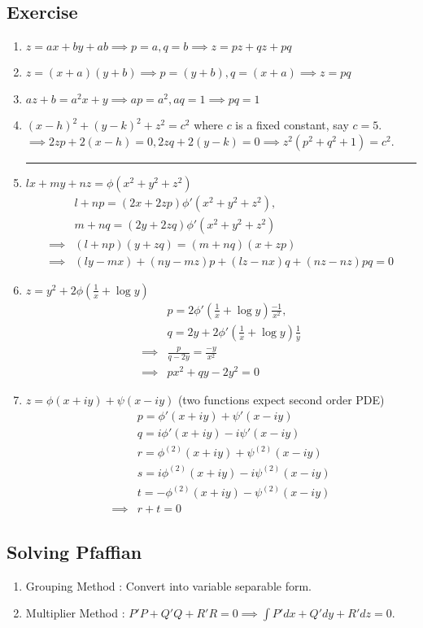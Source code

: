 \subsection{Exercise}
\begin{enumerate}
	\item $z = ax+by+ab \implies p = a, q=b \implies z = pz+qz+pq$
	\item $z = (x+a)(y+b) \implies p = (y+b),q = (x+a) \implies z = pq$
	\item $az+b = a^2x + y \implies ap = a^2,aq=1 \implies pq = 1$
	\item $(x-h)^2 + (y-k)^2 + z^2 = c^2$ where $c$ is a fixed constant, say $c = 5$.\\
		$\implies 2zp + 2(x-h) = 0, 2zq + 2(y-k) = 0 \implies z^2(p^2 + q^2 + 1) = c^2$.
	\hrule
\item $lx+my+nz = \phi(x^2+y^2+z^2)$ 
\begin{align*}
	& l+np = (2x+2zp)\phi'(x^2+y^2+z^2),\\
	& m+nq  = (2y+2zq)\phi'(x^2+y^2+z^2) \\
	\implies & (l+np)(y+zq)  = (m+nq)(x+zp) \\
	\implies & (ly-mx)+(ny-mz)p + (lz-nx)q + (nz-nz)pq = 0
\end{align*}
\item $z = y^2 + 2\phi(\frac{1}{x} + \log y)$ 
\begin{align*}
	& p = 2\phi'(\frac{1}{x}+\log y) \frac{-1}{x^2},\\
	& q = 2y + 2\phi'(\frac{1}{x} + \log y) \frac{1}{y}\\
	\implies & \frac{p}{q-2y} = \frac{-y}{x^2}\\
	\implies & px^2+qy-2y^2 = 0
\end{align*}
\item $z = \phi(x+iy)+\psi(x-iy)$ (two functions expect second order PDE)
\begin{align*}
	& p = \phi'(x+iy) + \psi'(x-iy)\\
	& q = i\phi'(x+iy) -i \psi'(x-iy)\\
	& r = \phi^{(2)}(x+iy) + \psi^{(2)}(x-iy) \\
	& s = i\phi^{(2)}(x+iy) -i \psi^{(2)}(x-iy) \\
	& t = -\phi^{(2)}(x+iy) -\psi^{(2)}(x-iy)\\
	\implies & r+t = 0
\end{align*}
\end{enumerate}

\subsection{Solving Pfaffian}
\begin{enumerate}
	\item Grouping Method : Convert into variable separable form.
	\item Multiplier Method : $P'P+Q'Q+R'R = 0 \implies \int P'dx + Q'dy + R'dz = 0$.
\end{enumerate}

